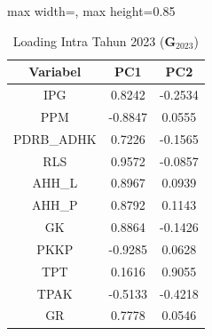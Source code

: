 \begin{table}[H]
\centering
\caption{Loading Intra Tahun 2023 ($\mathbf{G}_{2023}$)} \label{tab:loading_intra_2023}
\begin{adjustbox}{max width=\textwidth, max height=0.85\textheight}
\begin{tabular}{|c|c|c|}
\hline
\textbf{Variabel} & \textbf{PC1} & \textbf{PC2} \\
\hline
IPG & 0.8242 & -0.2534 \\
PPM & -0.8847 & 0.0555 \\
PDRB\_ADHK & 0.7226 & -0.1565 \\
RLS & 0.9572 & -0.0857 \\
AHH\_L & 0.8967 & 0.0939 \\
AHH\_P & 0.8792 & 0.1143 \\
GK & 0.8864 & -0.1426 \\
PKKP & -0.9285 & 0.0628 \\
TPT & 0.1616 & 0.9055 \\
TPAK & -0.5133 & -0.4218 \\
GR & 0.7778 & 0.0546 \\
\hline
\end{tabular}
\end{adjustbox}
\end{table}
